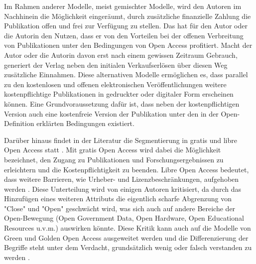 Im Rahmen anderer Modelle, meist gemischter Modelle, wird den Autoren im Nachhinein die Möglichkeit eingeräumt, durch zusätzliche finanzielle Zahlung die Publikation offen und frei zur Verfügung zu stellen\cite{Lewis_2012}. Das hat für den Autor oder die Autorin den Nutzen, dass er von den Vorteilen bei der offenen Verbreitung von Publikationen unter den Bedingungen von Open Access profitiert. Macht der Autor oder die Autorin davon erst nach einem gewissen Zeitraum Gebrauch, generiert der Verlag neben den initialen Verkaufserlösen über diesen Weg zusätzliche Einnahmen. Diese alternativen Modelle ermöglichen es, dass parallel zu den kostenlosen und offenen elektronischen Veröffentlichungen weitere kostenpflichtige Publikationen in gedruckter oder digitaler Form erscheinen können. Eine Grundvoraussetzung dafür ist, dass neben der kostenpflichtigen Version auch eine kostenfreie Version der Publikation unter den in der Open-Definition erklärten Bedingungen existiert.

Darüber hinaus findet in der Literatur die Segmentierung in gratis und libre Open Access statt \cite{Martin_2013} \cite{Naeder_2010} \cite{Mounce_2015}. Mit gratis Open Access wird dabei die Möglichkeit bezeichnet, den Zugang zu Publikationen und Forschungsergebnissen zu erleichtern und die Kostenpflichtigkeit zu beenden. Libre Open Access bedeutet, dass weitere Barrieren, wie Urheber- und Lizenzbeschränkungen, aufgehoben werden \cite{Adema_2014}. Diese Unterteilung wird von einigen Autoren kritisiert, da durch das Hinzufügen eines weiteren Attributs die eigentlich scharfe Abgrenzung von "Close" und "Open" geschwächt wird, was sich auch auf andere Bereiche der Open-Bewegung (Open Government Data, Open Hardware, Open Educational Resources‎ u.v.m.) auswirken könnte. Diese Kritik kann auch auf die Modelle von Green und Golden Open Access ausgeweitet werden und die Differenzierung der Begriffe steht unter dem Verdacht, grundsätzlich wenig oder falsch verstanden zu werden \cite{Mounce_2015}.

